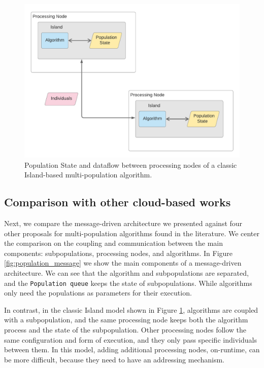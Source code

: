 \documentclass[review]{elsarticle}
\begin{document}
\begin{figure}[ht]
    \centering
    \includegraphics[width=\textwidth]{classicisland}
    \caption{ Population State and dataflow between processing nodes of a classic Island-based multi-population algorithm. }
    \label{fig:classicisland}
\end{figure}

\subsection{Comparison with other cloud-based works} 
\label{comparison}

Next, we compare the message-driven architecture we presented against four other
proposals for multi-population algorithms found in the literature. We center the
comparison on the coupling and communication between the main components:
subpopulations, processing nodes, and algorithms.  In Figure \ref{fig:population_message} we show the
main components of a message-driven architecture. We can see that the algorithm
and subpopulations are separated, and the \texttt{Population queue} keeps the state
of subpopulations. While algorithms only need the populations as parameters
for their execution.


In contrast, in the classic Island model shown in Figure
\ref{fig:classicisland}, algorithms are coupled with a subpopulation, and the same processing
node keeps both the algorithm process and the state of the subpopulation.  Other
processing nodes follow the same configuration and form of execution, and they
only pass specific individuals between them.  In this model, adding additional
processing nodes, on-runtime, can be more difficult, because they need to have
an addressing mechanism. %
\end{document}
